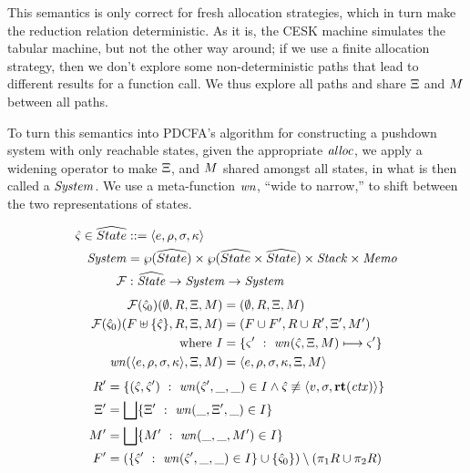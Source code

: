 This semantics is only correct for fresh allocation strategies, which in turn make the reduction relation deterministic.
%
As it is, the CESK machine simulates the tabular machine, but not the other way around;
%
if we use a finite allocation strategy, then we don't explore some non-deterministic paths that lead to different results for a function call.
%
We thus explore all paths and share $\Xi$ and $M$ between all paths.

To turn this semantics into PDCFA's algorithm for constructing a pushdown system with only reachable states, given the appropriate $\mathit{alloc}$, we apply a widening operator to make $\Xi$, and $M$ shared amongst all states, in what is then called a $\mathit{System}$. We use a meta-function $\mathit{wn}$, ``wide to narrow,'' to shift between the two representations of states.
%

{
\setlength{\abovedisplayskip}{0pt}
\setlength{\belowdisplayskip}{4pt}
\setlength{\abovedisplayshortskip}{0pt}
\setlength{\belowdisplayshortskip}{8pt}
\begin{align*}
  \hat\varsigma \in \widehat{State} &::= \langle e,\rho,\sigma,\kappa \rangle \\
  \mathit{System} &= \wp(\widehat{State}) \times \wp(\widehat{State} \times \widehat{State}) \times \mathit{Stack} \times \mathit{Memo} \\
  {\mathcal F} &: \widehat{\mathit{State}} \to \mathit{System} \to \mathit{System}
\end{align*}
\begin{align*}
  {\mathcal F}(\hat\varsigma_0)(\emptyset, R, \Xi, M) &= (\emptyset, R, \Xi, M) \\
  {\mathcal F}(\hat\varsigma_0)(F\uplus\{ \hat\varsigma \}, R, \Xi, M) &= (F\cup F', R \cup R', \Xi', M') \\
  \text{where } I &= \{ \varsigma'\ :\ \mathit{wn}(\hat\varsigma,\Xi,M) \longmapsto \varsigma'\} \\
                \mathit{wn}(\langle e,\rho,\sigma,\kappa \rangle,\Xi,M)
                   &= \langle e,\rho,\sigma,\kappa,\Xi,M \rangle
\end{align*}
\begin{align*}
    R' &= \setbuild{(\mastate,\mastate')}{\wn(\mastate', \_, \_) \in I \wedge \mastate\nequiv\tpl{\mval,\mstore,\krt{\mctx}}} \\
    \mktab' &=  \bigsqcup\setbuild{\mktab'}{\wn(\_, \mktab', \_) \in I} \\
    \mmemo' &= \bigsqcup\setbuild{\mmemo'}{\wn(\_, \_, \mmemo') \in I} \\
    F' &= (\setbuild{\mastate'}{\wn(\mastate', \_, \_) \in I} \cup \set{\mastate_0})\setminus (\pi_1 R \cup \pi_2 R)
  \end{align*}
}

